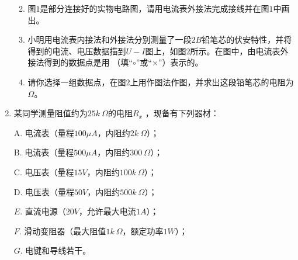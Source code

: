 \begin{enumerate}[leftmargin=0em]
\begin{enumerate}
\renewcommand{\labelenumi}{\arabic{enumi}.}
\item
图$ 1 $是部分连接好的实物电路图，请用电流表外接法完成接线并在图$ 1 $中画出。
\item 
小明用电流表内接法和外接法分别测量了一段$ 2B $铅笔芯的伏安特性，并将得到的电流、电压数据描到$ U-I $图上，如图$ 2 $所示。在图中，由电流表外接法得到的数据点是用 \tk{$ \times $}（填“$ \circ $”或“$ \times $”）表示的。
\item 
请你选择一组数据点，在图$ 2 $上用作图法作图，并求出这段铅笔芯的电阻为$ \Omega $。



\end{enumerate}






\item 
{}
某同学测量阻值约为$ 25k \ \Omega $的电阻$ R_x $ ，现备有下列器材：

A. 电流表（量程$ 100 \mu A $，内阻约$ 2k \ \Omega $）；

B. 电流表（量程$ 500 \mu A $，内阻约$ 300 \ \Omega $）；

C. 电压表（量程$ 15V $，内阻约$ 100k \ \Omega $）；

D. 电压表（量程$ 50V $，内阻约$ 500k \ \Omega $）；

$ E $. 直流电源（$ 20V $，允许最大电流$ 1A $）；

$ F $. 滑动变阻器（最大阻值$ 1k \ \Omega $，额定功率$ 1W $）；

$ G $. 电键和导线若干。


\end{enumerate}
